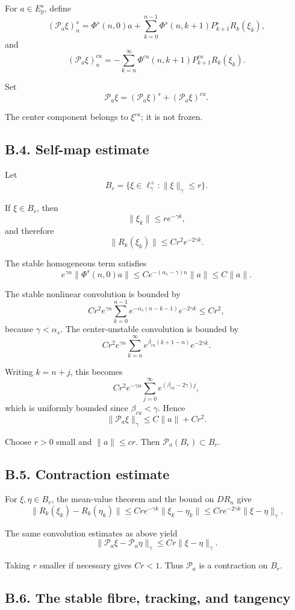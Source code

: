 \documentclass[12pt,a4paper]{article}
\theoremstyle{plain}
\numberwithin{equation}{section}
\numberwithin{theorem}{section}
\begin{document}
For $a\in E^s_p$, define
\[
(\mathcal P_a\xi)_n^s
=
\Phi^s(n,0)a+
\sum_{k=0}^{n-1}
\Phi^s(n,k+1)P^s_{k+1}R_k(\xi_k),
\]
and
\[
(\mathcal P_a\xi)_n^{cu}
=
-
\sum_{k=n}^{\infty}
\Phi^{cu}(n,k+1)P^{cu}_{k+1}R_k(\xi_k).
\]

Set
\[
\mathcal P_a\xi=(\mathcal P_a\xi)^s+(\mathcal P_a\xi)^{cu}.
\]

The center component belongs to $\xi^{cu}$; it is not frozen.

\subsection{B.4. Self-map estimate}

Let
\[
B_r=\{\xi\in\ell_\gamma^+:\|\xi\|_\gamma\le r\}.
\]

If $\xi\in B_r$, then
\[
\|\xi_k\|\le r e^{-\gamma k},
\]
and therefore
\[
\|R_k(\xi_k)\|\le Cr^2e^{-2\gamma k}.
\]

The stable homogeneous term satisfies
\[
e^{\gamma n}\|\Phi^s(n,0)a\|
\le
C e^{-(\alpha_s-\gamma)n}\|a\|
\le C\|a\|.
\]

The stable nonlinear convolution is bounded by
\[
C r^2 e^{\gamma n}
\sum_{k=0}^{n-1}e^{-\alpha_s(n-k-1)}e^{-2\gamma k}
\le C r^2,
\]
because $\gamma<\alpha_s$. The center-unstable convolution is bounded by
\[
C r^2 e^{\gamma n}
\sum_{k=n}^{\infty}e^{\beta_{cu}(k+1-n)}e^{-2\gamma k}.
\]

Writing $k=n+j$, this becomes
\[
C r^2 e^{-\gamma n}
\sum_{j=0}^{\infty}e^{(\beta_{cu}-2\gamma)j},
\]
which is uniformly bounded since $\beta_{cu}<\gamma$. Hence
\[
\|\mathcal P_a\xi\|_\gamma
\le
C\|a\|+Cr^2.
\]

Choose $r>0$ small and $\|a\|\le c r$. Then $\mathcal P_a(B_r)\subset B_r$.

\subsection{B.5. Contraction estimate}

For $\xi,\eta\in B_r$, the mean-value theorem and the bound on $DR_n$ give
\[
\|R_k(\xi_k)-R_k(\eta_k)\|
\le
C r e^{-\gamma k}\|\xi_k-\eta_k\|
\le
C r e^{-2\gamma k}\|\xi-\eta\|_\gamma.
\]

The same convolution estimates as above yield
\[
\|\mathcal P_a\xi-\mathcal P_a\eta\|_\gamma
\le
C r\|\xi-\eta\|_\gamma.
\]

Taking $r$ smaller if necessary gives $Cr<1$. Thus $\mathcal P_a$ is a contraction on $B_r$.

\subsection{B.6. The stable fibre, tracking, and tangency}
\end{document}
